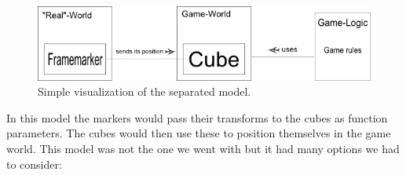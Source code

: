 \begin{figure}[ht] 
        \capstart
        \centering  
        \includegraphics[width=\textwidth]{includes/complexCubeMarkerModel.png}    
        \caption[Separated Cube-Marker model]{Simple visualization of the separated model.} 
        \label{fig:complex_cube_marker_model} 
\end{figure}

In this model the markers would pass their transforms to the cubes as function parameters. 
The cubes would then use these to position themselves in the game world. 
This model was not the one we went with but it had many options we had to consider:
